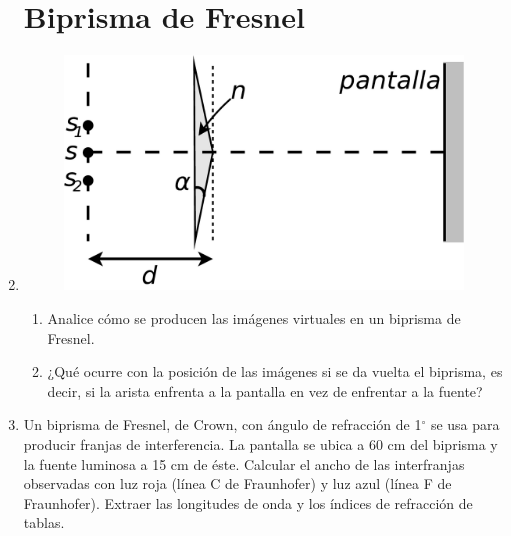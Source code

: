 \documentclass[11pt,spanish,a4paper]{article}
\begin{document}
\begin{enumerate}
\section*{Biprisma de Fresnel}
\item 
\begin{figure}[H]
\centering{}\includegraphics[clip,scale=0.3]{ej5-11}
\end{figure}
\begin{enumerate}
\item Analice cómo se producen las imágenes virtuales en un biprisma de
Fresnel.
\item ¿Qué ocurre con la posición de las imágenes si se da vuelta el biprisma,
es decir, si la arista enfrenta a la pantalla en vez de enfrentar
a la fuente?
\end{enumerate}


\item Un biprisma de Fresnel, de Crown, con ángulo de refracción de 1$^{\circ}$
se usa para producir franjas de interferencia. La pantalla se ubica
a 60 cm del biprisma y la fuente luminosa a 15 cm de éste. Calcular
el ancho de las interfranjas observadas con luz roja (línea C de Fraunhofer)
y luz azul (línea F de Fraunhofer). Extraer las longitudes de onda
y los índices de refracción de tablas.



\end{enumerate}
\end{document}

